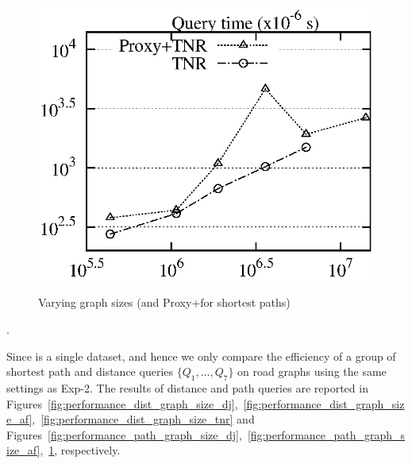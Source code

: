 \begin{figure}[tb!]
\begin{center}
{\includegraphics[scale=0.422]{./exp/query_q7_path_tnr.eps}}
\end{center}
\vspace{-0.5ex}
\caption{Varying graph sizes (\tnr and Proxy+\tnr for shortest paths)}
\label{fig:performance_path_graph_size_tnr}
\vspace{-1ex}
\end{figure}



.

  Since \dblpone is a single dataset, and hence we only compare the efficiency of a group of shortest path and distance queries $\{Q_1, \ldots, Q_7\}$  on road graphs using the same settings as Exp-2.
 The results of distance and path queries are reported in Figures~\ref{fig:performance_dist_graph_size_dj},~\ref{fig:performance_dist_graph_size_af},~\ref{fig:performance_dist_graph_size_tnr} and Figures~\ref{fig:performance_path_graph_size_dj},~\ref{fig:performance_path_graph_size_af},~\ref{fig:performance_path_graph_size_tnr}, respectively.


